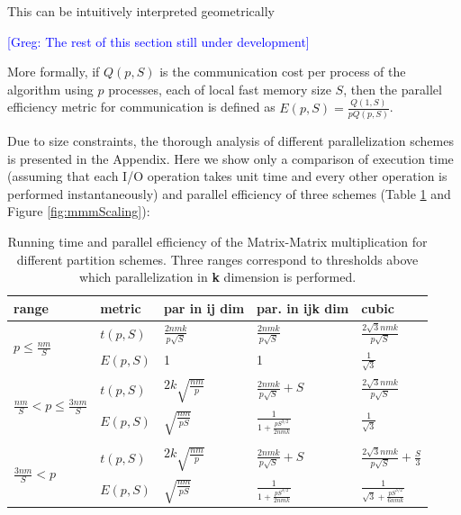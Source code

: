 \documentclass[sigplan,review,anonymous]{acmart}\settopmatter{printfolios=true,printccs=false,printacmref=false}
\newcommand\greg[1]{\textcolor{blue}{[Greg: #1]}}
\begin{document}
This can be intuitively interpreted geometrically 

\greg{The rest of this section still under development}

More 
formally, if $Q(p,S)$ is the communication cost per process of the algorithm 
using $p$ 
processes, each of local fast memory size $S$, then the parallel efficiency 
metric for communication is defined as $E(p,S) = \frac{Q(1,S)}{pQ(p,S)}$.

 Due to size constraints, the thorough analysis of different parallelization 
schemes is presented in the Appendix.  Here we show only a comparison of 
execution time (assuming that each I/O operation takes unit time and every 
other operation is performed instantaneously) and parallel efficiency of three 
schemes (Table \ref{tab:mmmEfficiency} and Figure \ref{fig:mmmScaling}): 

\begin{table}[t]
\begin{tabular}{lllll}
\toprule
range & metric & par in \textbf{ij} dim & par. in \textbf{ijk} dim & cubic \\
\midrule 
\multirow{2}{*}{$p \le \frac{nm}{S}$} & $t(p,S)$ & $\frac{2nmk}{p\sqrt{S}}$ & 
$\frac{2nmk}{p\sqrt{S}}$ & $\frac{2\sqrt{3}nmk}{p\sqrt{S}}$ \\
& $E(p,S)$ & 1 & 1 & 	$\frac{1}{\sqrt{3}}$\\
\midrule 
\multirow{2}{*}{$\frac{nm}{S} < p \le \frac{3nm}{S}$} & $t(p,S)$ & $2k 
\sqrt{\frac{nm}{p}}$ & 
$\frac{2nmk}{p\sqrt{S}} + S$ & $\frac{2\sqrt{3}nmk}{p\sqrt{S}}$ 
\\
& $E(p,S)$ & $\sqrt{\frac{nm}{pS}}$ & $\frac{1}{1 + 
\frac{pS^{3/2}}{2nmk}}$ & 	$\frac{1}{\sqrt{3}}$ \\
\midrule \\
\multirow{2}{*}{$\frac{3nm}{S} < p$} & $t(p,S)$ & $2k 
\sqrt{\frac{nm}{p}}$ & 
$\frac{2nmk}{p\sqrt{S}} + S$ & $\frac{2\sqrt{3}nmk}{p\sqrt{S}} + 
\frac{S}{3}$\\
& $E(p,S)$ & $\sqrt{\frac{nm}{pS}}$ & $\frac{1}{1 + 
\frac{pS^{3/2}}{2nmk}}$ &	$\frac{1}{\sqrt{3} + 
\frac{pS^{3/2}}{6nmk}}$
\end{tabular}
\caption{Running time and parallel efficiency of the Matrix-Matrix 
multiplication for different partition schemes. Three ranges correspond 
to thresholds above which parallelization in \textbf{k} dimension is 
performed.}
\label{tab:mmmEfficiency}
\end{table}
\end{document}
